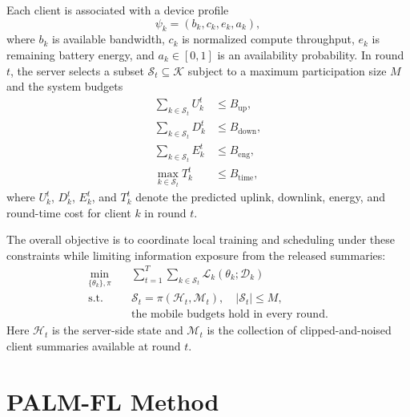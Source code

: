 \documentclass[10pt,journal]{IEEEtran}
\begin{document}
Each client is associated with a device profile
\begin{equation}
\psi_k = (b_k, c_k, e_k, a_k),
\end{equation}
where $b_k$ is available bandwidth, $c_k$ is normalized compute throughput, $e_k$ is remaining battery energy, and $a_k \in [0,1]$ is an availability probability. In round $t$, the server selects a subset $\mathcal{S}_t \subseteq \mathcal{K}$ subject to a maximum participation size $M$ and the system budgets
\begin{align}
\sum_{k\in\mathcal{S}_t} U_k^t &\le B_{\text{up}}, \\
\sum_{k\in\mathcal{S}_t} D_k^t &\le B_{\text{down}}, \\
\sum_{k\in\mathcal{S}_t} E_k^t &\le B_{\text{eng}}, \\
\max_{k\in\mathcal{S}_t} T_k^t &\le B_{\text{time}},
\end{align}
where $U_k^t$, $D_k^t$, $E_k^t$, and $T_k^t$ denote the predicted uplink, downlink, energy, and round-time cost for client $k$ in round $t$.

The overall objective is to coordinate local training and scheduling under these constraints while limiting information exposure from the released summaries:
\begin{align}
\min_{\{\theta_k\},\pi} \quad & \sum_{t=1}^{T}\sum_{k\in\mathcal{S}_t}\mathcal{L}_k(\theta_k;\mathcal{D}_k)
\label{eq:global_problem}\\
\text{s.t.}\quad & \mathcal{S}_t = \pi(\mathcal{H}_t,\mathcal{M}_t), \quad |\mathcal{S}_t| \le M,
\nonumber\\
& \text{the mobile budgets hold in every round}.
\nonumber
\end{align}
Here $\mathcal{H}_t$ is the server-side state and $\mathcal{M}_t$ is the collection of clipped-and-noised client summaries available at round $t$.

\section{PALM-FL Method}
\end{document}
